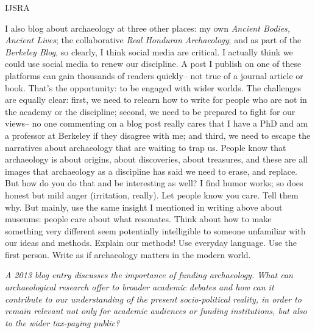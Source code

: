 \begin{labeling}{IJSRA}
\item[RAJ] I also blog about archaeology at three other places: my own \emph{Ancient Bodies, Ancient Lives}; the collaborative \emph{Real Honduran Archaeology}; and as part of the \emph{Berkeley Blog}, so clearly, I think social media are critical. I actually think we could use social media to renew our discipline. A post I publish on one of these platforms can gain thousands of readers quickly-- not true of a journal article or book. That's the opportunity: to be engaged with wider worlds. The challenges are equally clear: first, we need to relearn how to write for people who are not in the academy or the discipline; second, we need to be prepared to fight for our views-- no one commenting on a blog post really cares that I have a PhD and am a professor at Berkeley if they disagree with me; and third, we need to escape the narratives about archaeology that are waiting to trap us. People know that archaeology is about origins, about discoveries, about treasures, and these are all images that archaeology as a discipline has said we need to erase, and replace. But how do you do that and be interesting as well? I find humor works; so does honest but mild anger (irritation, really). Let people know you care. Tell them why. But mainly, use the same insight I mentioned in writing above about museums: people care about what resonates. Think about how to make something very different seem potentially intelligible to someone unfamiliar with our ideas and methods. Explain our methods! Use everyday language. Use the first person. Write as if archaeology matters in the modern world. 
	
\item[IJSRA] \emph{A 2013 blog entry discusses the importance of funding archaeology. What can archaeological research offer to broader academic debates and how can it contribute to our understanding of the present socio-political reality, in order to remain relevant not only for academic audiences or funding institutions, but also to the wider tax-paying public?}


\end{labeling}
